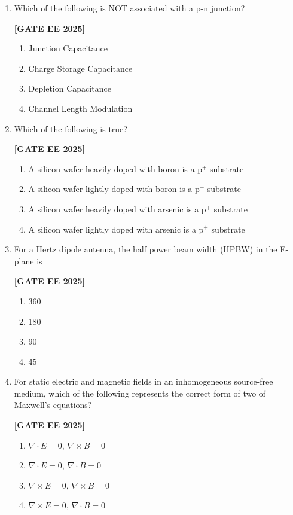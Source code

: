 \documentclass[12pt]{article}
\begin{document}
\begin{enumerate}[leftmargin=2.5em, label=\textbf{Q.\arabic*}., itemsep=2em]
\item
Which of the following is NOT associated with a p-n junction?
 
\noindent \textbf{[GATE EE 2025]}
\begin{enumerate}
  \item Junction Capacitance
  \item Charge Storage Capacitance
  \item Depletion Capacitance
  \item Channel Length Modulation
\end{enumerate}

\item
Which of the following is true?
 
\noindent \textbf{[GATE EE 2025]}
\begin{enumerate}
  \item A silicon wafer heavily doped with boron is a p$^+$ substrate
  \item A silicon wafer lightly doped with boron is a p$^+$ substrate
  \item A silicon wafer heavily doped with arsenic is a p$^+$ substrate
  \item A silicon wafer lightly doped with arsenic is a p$^+$ substrate
\end{enumerate}

\item
For a Hertz dipole antenna, the half power beam width (HPBW) in the E-plane is
 
\noindent \textbf{[GATE EE 2025]}
\begin{enumerate}
  \item 360\degree
  \item 180\degree
  \item 90\degree
  \item 45\degree
\end{enumerate}

\item
For static electric and magnetic fields in an inhomogeneous source-free medium, which of the following represents the correct form of two of Maxwell's equations?

\noindent \textbf{[GATE EE 2025]}
\begin{enumerate}
  \item $\nabla \cdot E = 0$, \quad $\nabla \times B = 0$
  \item $\nabla \cdot E = 0$, \quad $\nabla \cdot B = 0$
  \item $\nabla \times E = 0$, \quad $\nabla \times B = 0$
  \item $\nabla \times E = 0$, \quad $\nabla \cdot B = 0$
\end{enumerate}



\end{enumerate}
\end{document}
